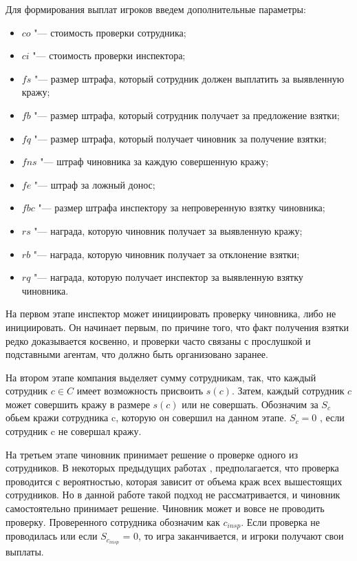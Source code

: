 Для формирования выплат игроков введем дополнительные параметры:
\begin{itemize}
	\item $co$ "--- стоимость проверки сотрудника;
	\item $ci$ "--- стоимость проверки инспектора;
	\item $fs$ "--- размер штрафа, который сотрудник должен выплатить за выявленную кражу;
	\item $fb$ "--- размер штрафа, который сотрудник получает за предложение взятки;
	\item $fq$ "--- размер штрафа, который получает чиновник за получение взятки;
	\item $fns$ "--- штраф чиновника за каждую совершенную кражу;
	\item $fe$ "--- штраф за ложный донос;
	\item $fbc$ "--- размер штрафа инспектору за непроверенную взятку чиновника;
	\item $rs$ "--- награда, которую чиновник получает за выявленную кражу;
	\item $rb$ "--- награда, которую чиновник получает за отклонение взятки;
	\item $rq$ "--- награда, которую получает инспектор за выявленную взятку чиновника.
\end{itemize}
На первом этапе инспектор может инициировать проверку чиновника, либо не инициировать. Он начинает первым, по причине того, что факт получения взятки редко доказывается косвенно, и проверки часто связаны с прослушкой и подставными агентам, что должно быть организовано заранее.
\par
На втором этапе компания выделяет сумму сотрудникам, так, что каждый сотрудник $c \in C$ имеет возможность присвоить $s(c)$. Затем, каждый сотрудник $c$ может совершить кражу в размере $s(c)$ или не совершать. Обозначим за $S_c$ обьем кражи сотрудника c, которую он совершил на данном этапе. $S_c = 0$ , если сотрудник c не совершал кражу.
\par
На третьем этапе чиновник принимает решение о проверке одного из сотрудников. В некоторых предыдущих работах \cite{Orlov}, предполагается, что проверка проводится с вероятностью, которая зависит от объема краж всех вышестоящих сотрудников. Но в данной работе такой подход не рассматривается, и чиновник самостоятельно принимает решение. Чиновник может и вовсе не проводить проверку. Проверенного сотрудника обозначим как $c_{insp}$. Если проверка не проводилась или если $S_{c_{insp}}$ = 0, то игра заканчивается, и игроки получают свои выплаты. 
